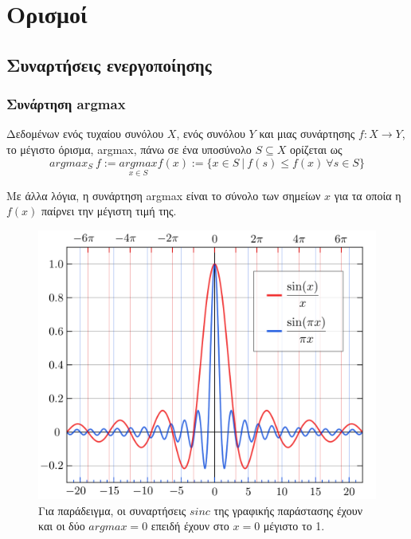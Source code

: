 \section*{Ορισμοί}
\newtheorem{definition}{Ορισμός}
\label{appendix:math_definitions}

\subsection{Συναρτήσεις ενεργοποίησης}
\subsubsection{Συνάρτηση argmax}
\label{definition:argmax}
Δεδομένων ενός τυχαίου συνόλου \(X\), ενός συνόλου \(Y\) και μιας συνάρτησης \(f: X\rightarrow Y\), το μέγιστο όρισμα, argmax, πάνω σε ένα υποσύνολο \(S \subseteq X\) ορίζεται ως
\[argmax_{S} \: f := \underset{x \in S}{argmax} f(x) := \{x \in S \: | \: f(s) \leq f(x)  \: \forall s \in S\} \]


Με άλλα λόγια, η συνάρτηση argmax είναι το σύνολο των σημείων \(x\) για τα οποία η \(f(x)\) παίρνει την μέγιστη τιμή της.

\begin{figure}[h]
	\centering
	\includegraphics[scale=0.2]{images/appendix/function_argmax_example.png}
	\caption[Παράδειγμα συνάρτησης argmax]{Για παράδειγμα, οι συναρτήσεις \(sinc\) της γραφικής παράστασης έχουν και οι δύο \(argmax = 0\) επειδή έχουν στο \(x = 0\) μέγιστο το 1. }
\end{figure}


